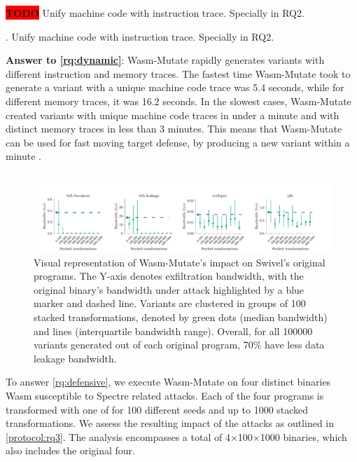 \documentclass[sigplan,screen]{acmart}
\newcommand*\badge[1]{ \colorbox{red}{\color{white}#1}}
\newcommand{\tool}{{\sc Wasm-Mutate}\xspace}
\newcommand{\wasm}{Wasm\xspace}
\newcommand{\todo}[1]{%
\refstepcounter{todo}
\noindent\textbf{\badge{TODO}} {\color{red}#1}
\addcontentsline{td}{todo}
{\color{red}\thesection.\thetodo\xspace #1}}
\begin{document}
\todo{Unify machine code with instruction trace. Specially in RQ2.}

\begin{tcolorbox}[boxrule=1pt,arc=.3em,boxsep=-1.3mm]
  \textbf{Answer to \ref{rq:dynamic}}:  \tool rapidly generates variants with different instruction and memory traces. 
  The fastest time \tool took to generate a variant with a unique machine code trace was 5.4 seconds, while for different memory traces, it was 16.2 seconds. 
  In the slowest cases, \tool created variants with unique machine code traces in under a minute and with distinct memory traces in less than 3 minutes.
  This means that \tool can be used for fast moving target defense, by producing a new variant within a minute \cite{MEWE}.
\end{tcolorbox}


\subsection{\rqdefensive}



\begin{figure}
    \centering
    \includegraphics[width=\linewidth]{plots/rq3/results.rq3.pdf}
    \caption{Visual representation of \tool's impact on Swivel's original programs. The Y-axis denotes exfiltration bandwidth, with the original binary's bandwidth under attack highlighted by a blue marker and dashed line. Variants are clustered in groups of 100 stacked transformations, denoted by green dots (median bandwidth) and lines (interquartile bandwidth range). Overall, for all 100000 variants generated out of each original program, 70\% have less data leakage bandwidth.}
  \label{attacks:impact}
\end{figure}


To answer \ref{rq:defensive}, we execute \tool on four distinct binaries \wasm susceptible to Spectre related attacks. Each of the four programs is transformed with one of for 100 different seeds and up to 1000 stacked transformations. 
We assess the resulting impact of the attacks as outlined in \ref{protocol:rq3}. 
The  analysis encompasses a total of 4$\times$100$\times$1000 binaries, which also includes the original four.
\end{document}
